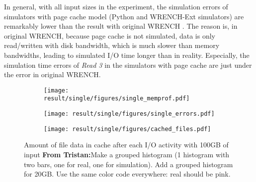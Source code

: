\documentclass[conference]{IEEEtran}
\newcommand{\tristan}[1]{\color{orange}\textbf{From Tristan:}#1\color{black}}
\begin{document}
            In general, with all input sizes in the experiment, the simulation errors 
            of simulators with page cache model (Python and WRENCH-Ext simulators) 
            are remarkably lower than the result with original WRENCH . 
            The reason is, in original WRENCH, because page cache is not simulated, 
            data is only read/written with disk bandwidth, which is much slower 
            than memory bandwidths, leading to simulated I/O time longer than in reality.
            Especially, the simulation time errors of \textit{Read 3} in the simulators 
            with page cache are just under the error in original WRENCH. 
        
            \begin{figure*}
            \centering
            \begin{subfigure}{\linewidth}
                \centering
                   \texttt{[image: result/single/figures/single\_memprof.pdf]}
            \end{subfigure}
            \caption{Memory profiling results with different input file sizes \tristan{put the simulation/real conditions on the side, make them larger and use the same color code as below (pink for real, etc). Put the memory values on top, similar to how they are in the graphs below. }}
            \label{fig:single_memprof}    
            \begin{subfigure}{\linewidth}
                \centering
                   \texttt{[image: result/single/figures/single\_errors.pdf]}
            \end{subfigure}
            \caption{Simulation errors with different input file sizes}
            \label{fig:single_error}    
            \begin{subfigure}{\linewidth}
                \centering
                   \texttt{[image: result/single/figures/cached\_files.pdf]}
            \end{subfigure}    
            \label{fig:single_cache}
               \caption{Amount of file data in cache after each I/O activity with 100GB of input \tristan{Make a grouped histogram (1 histogram with two bars, one for real, one for simulation). Add a grouped histogram for 20GB. Use the same color code everywhere: real should be pink.}}
            \end{figure*}            
\end{document}
